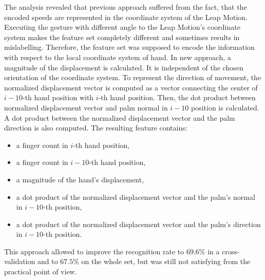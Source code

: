 The analysis revealed that previous approach suffered from the fact, that the encoded speeds are represented in the coordinate system of the Leap Motion.
Executing the gesture with different angle to the Leap Motion's coordinate system makes the feature set completely different and sometimes results in mislabelling.
Therefore, the feature set was supposed to encode the information with respect to the local coordinate system of hand. 
In new approach, a magnitude of the displacement is calculated. 
It is independent of the chosen orientation of the coordinate system.
To represent the direction of movement, the normalized displacement vector is computed as a vector connecting the center of $i-10$-th hand position with $i$-th hand position.
Then, the dot product between normalized displacement vector and palm normal in $i-10$ position is calculated.
A dot product between the normalized displacement vector and the palm direction is also computed.
The resulting feature contains:
\begin{itemize}
\item a finger count in $i$-th hand position,
\item a finger count in $i-10$-th hand position,
\item a magnitude of the hand's displacement,
\item a dot product of the normalized displacement vector and the palm's normal in $i-10$-th position,
\item a dot product of the normalized displacement vector and the palm's direction in $i-10$-th position.
\end{itemize}
This approach allowed to improve the recognition rate to $69.6\%$ in a cross-validation and to $67.5\%$ on the whole set, but was still not satisfying from the practical point of view.

